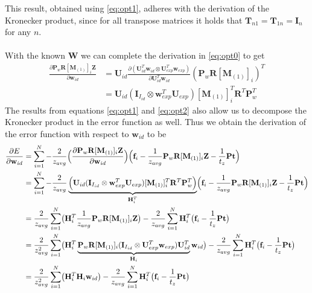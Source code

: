 \documentclass[11pt,a4paper]{report}
\begin{document}
This result, obtained using \ref{eq:opt1}, adheres with the derivation of
the Kronecker product, since for all transpose matrices it holds that $\mathbf{T}_{n1} =
\mathbf{T}_{1n} = \mathbf{I}_n$ for any $n$.\\
\\
With the known $\mathbf{W}$ we can complete the derivation in \ref{eq:opt0} to get
\begin{align}
\frac
{\partial 
\mathbf{P}_w\mathbf{R}[\mathbf{M}_{(1)}]_{i}\mathbf{Z}
}
{\partial
\mathbf{w}_{id}
}
&=\mathbf{U}_{id}
\frac
{\partial
(\mathbf{U}_{id}^T\mathbf{w}_{id} \otimes \mathbf{U}_{exp}^T\mathbf{w}_{exp})
}
{\partial
\mathbf{U}_{id}^T\mathbf{w}_{id}
}
(\mathbf{P}_w\mathbf{R}[\mathbf{M}_{(1)}]_{i})^T\nonumber\\
&=
\mathbf{U}_{id}
(\mathbf{I}_{I_{id}} \otimes
\mathbf{w}_{exp}^T\mathbf{U}_{exp})
[\mathbf{M}_{(1)}]_{i}^T\mathbf{R}^T\mathbf{P}_w^T
\end{align}
The results from equations \ref{eq:opt1} and \ref{eq:opt2} also allow us to decompose the Kronecker product
in the error function as well. Thus we obtain the derivation of the error function with respect to
$\mathbf{w}_{id}$ to be
\begin{align*}\label{eq:opt4}
\frac{\partial E}{\partial \mathbf{w}_{id}} &= \sum_{i=1}^N -\frac{2}{z_{avg}}\Bigl(
\frac{\partial \mathbf{P}_w\mathbf{R}[\mathbf{M}_{(1)}]_{i}\mathbf{Z}}
{\partial \mathbf{w}_{id}}\Bigr)\Bigl(\mathbf{f}_i - \frac{1}{z_{avg}}\mathbf{P}_w\mathbf{R}[\mathbf{M}_{(1)}]_{i}\mathbf{Z} - \frac{1}{t_z}\mathbf{P}\mathbf{t}\Bigr)\\
&=\sum_{i=1}^N -\frac{2}{z_{avg}}\underbrace{\Bigl(\mathbf{U}_{id} (\mathbf{I}_{I_{id}} \otimes \mathbf{w}_{exp}^T\mathbf{U}_{exp}) [\mathbf{M}_{(1)}]_{i}^T\mathbf{R}^T\mathbf{P}_w^T\Bigr)}_{\mathbf{H}_i^T}\Bigl(\mathbf{f}_i - \frac{1}{z_{avg}}\mathbf{P}_w\mathbf{R}[\mathbf{M}_{(1)}]_{i}\mathbf{Z} - \frac{1}{t_z}\mathbf{P}\mathbf{t}
\Bigr)\\
&= \frac{2}{z_{avg}}\sum_{i=1}^N\bigl(
\mathbf{H}_i^T\frac{1}{z_{avg}}\mathbf{P}_w\mathbf{R}[\mathbf{M}_{(1)}]_{i}\mathbf{Z}\bigr)
-
\frac{2}{z_{avg}}\sum_{i=1}^N \mathbf{H}_i^T\bigl(\mathbf{f}_i - \frac{1}{t_z}\mathbf{P}\mathbf{t}
\bigr)\\
&=
\frac{2}{z_{avg}^2}\sum_{i=1}^N\bigl(
\mathbf{H}_i^T\underbrace{\mathbf{P}_w\mathbf{R}[\mathbf{M}_{(1)}]_{i}(\mathbf{I}_{I_{id}} \otimes \mathbf{U}_{exp}^T\mathbf{w}_{exp})\mathbf{U}_{id}^T}_{\mathbf{H}_i}\mathbf{w}_{id}\bigr)
-
\frac{2}{z_{avg}}\sum_{i=1}^N \mathbf{H}_i^T\bigl(\mathbf{f}_i -
\frac{1}{t_z}\mathbf{P}\mathbf{t}\bigr)\\
&=\frac{2}{z_{avg}^2}\sum_{i=1}^N\bigl(
\mathbf{H}_i^T\mathbf{H}_i\mathbf{w}_{id}\bigr)
-
\frac{2}{z_{avg}}\sum_{i=1}^N \mathbf{H}_i^T\bigl(\mathbf{f}_i -
\frac{1}{t_z}\mathbf{P}\mathbf{t}\bigr)
\end{align*}
\end{document}
